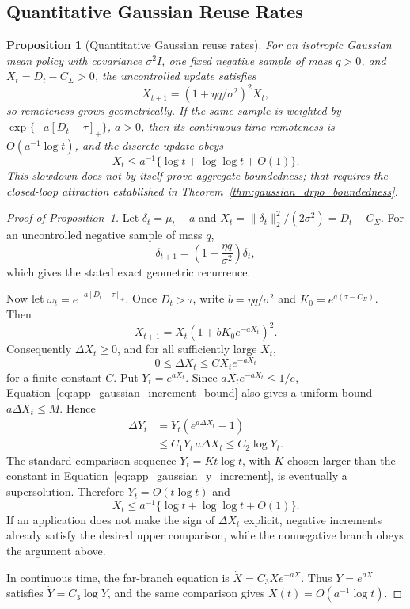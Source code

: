 \documentclass{article}
\theoremstyle{plain}
\newtheorem{proposition}[theorem]{Proposition}
\theoremstyle{definition}
\theoremstyle{remark}
\begin{document}
\subsection{Quantitative Gaussian Reuse Rates}
\label{app:gaussian_reuse_rate}

\begin{proposition}[Quantitative Gaussian reuse rates]
\label{prop:reuse_rate}
For an isotropic Gaussian mean policy with covariance \(\sigma^2I\),
one fixed negative sample of mass \(q>0\), and
\(X_t=D_t-C_\Sigma>0\), the uncontrolled update satisfies
\[
 X_{t+1}=\left(1+\eta q/\sigma^2\right)^2X_t,
\]
so remoteness grows geometrically. If the same sample is weighted by
\(\exp\{-a[D_t-\tau]_+\}\), \(a>0\), then its continuous-time
remoteness is \(O(a^{-1}\log t)\), and the discrete update obeys
\[
 X_t\le a^{-1}\{\log t+\log\log t+O(1)\}.
\]
This slowdown does not by itself prove aggregate boundedness; that requires
the closed-loop attraction established in
Theorem~\ref{thm:gaussian_drpo_boundedness}.
\end{proposition}

\begin{proof}[Proof of Proposition~\ref{prop:reuse_rate}]
Let \(\delta_t=\mu_t-a\) and
\(X_t=\|\delta_t\|_2^2/(2\sigma^2)=D_t-C_\Sigma\).
For an uncontrolled negative sample of mass \(q\),
\[
\delta_{t+1}
=\left(1+\frac{\eta q}{\sigma^2}\right)\delta_t,
\]
which gives the stated exact geometric recurrence.

Now let \(\omega_t=e^{-a[D_t-\tau]_+}\). Once
\(D_t>\tau\), write
\(b=\eta q/\sigma^2\) and
\(K_0=e^{a(\tau-C_\Sigma)}\). Then
\begin{equation}
X_{t+1}=X_t\left(1+bK_0e^{-aX_t}\right)^2.
\label{eq:app_tapered_gaussian_recurrence}
\end{equation}
Consequently \(\Delta X_t\ge0\), and for all sufficiently large
\(X_t\),
\begin{equation}
0\le\Delta X_t\le C X_te^{-aX_t}
\label{eq:app_gaussian_increment_bound}
\end{equation}
for a finite constant \(C\). Put \(Y_t=e^{aX_t}\). Since
\(aX_te^{-aX_t}\le1/e\),
Equation~\eqref{eq:app_gaussian_increment_bound} also gives a uniform
bound \(a\Delta X_t\le M\). Hence
\begin{align}
\Delta Y_t
&=Y_t(e^{a\Delta X_t}-1) \\
&\le C_1Y_t\,a\Delta X_t
\le C_2\log Y_t.
\label{eq:app_gaussian_y_increment}
\end{align}
The standard comparison sequence
\(\overline Y_t=K t\log t\), with \(K\) chosen larger than the
constant in Equation~\eqref{eq:app_gaussian_y_increment}, is eventually
a supersolution. Therefore
\(Y_t=O(t\log t)\) and
\[
X_t\le a^{-1}\{\log t+\log\log t+O(1)\}.
\]
If an application does not make the sign of \(\Delta X_t\) explicit,
negative increments already satisfy the desired upper comparison, while
the nonnegative branch obeys the argument above.

In continuous time, the far-branch equation is
\(\dot X=C_3Xe^{-aX}\). Thus
\(Y=e^{aX}\) satisfies \(\dot Y=C_3\log Y\), and the same comparison
gives \(X(t)=O(a^{-1}\log t)\).
\end{proof}
\end{document}
